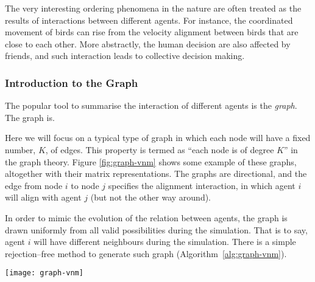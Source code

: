 \documentclass[11pt,twoside]{report}
\begin{document}

The very interesting ordering phenomena in the nature are often treated as the results of interactions between different agents. For instance, the coordinated movement of birds can rise from the velocity alignment between birds that are close to each other. More abstractly, the human decision are also affected by friends, and such interaction leads to collective decision making.

\subsubsection*{Introduction to the Graph}

The popular tool to summarise the interaction of different agents is the \emph{graph}. The graph is.

Here we will focus on a typical type of graph in which each node will have a fixed number, $K$, of edges. This property is termed as ``each node is of degree $K$'' in the graph theory. Figure \ref{fig:graph-vnm} shows some example of these graphs, altogether with their matrix representations. The graphs are directional, and the edge from node $i$ to node $j$ specifies the alignment interaction, in which agent $i$ will align with agent $j$ (but not the other way around).

In order to mimic the evolution of the relation between agents, the graph is drawn uniformly from all valid possibilities during the simulation. That is to say, agent $i$ will have different neighbours during the simulation. There is a simple rejection--free method to generate such graph (Algorithm~\ref{alg:graph-vnm}).



\begin{SCfigure}
  \texttt{[image: graph-vnm]}
  \caption[Examples of graphs for vectorial network model]{Graph and matrix representation of the vectorial network model, with increasing connection number ($K$). The top row illustrate the relationship between 5 agents. And the arrow from $i$ to $j$ indicates that agent $i$ will align with agent $j$. The bottom row indicates the adjacency matrices of these graphs. }
  \label{fig:graph-vnm}
\end{SCfigure}
\end{document}
